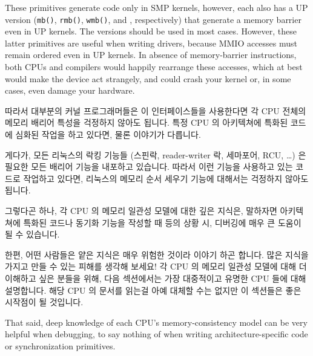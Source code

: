 These primitives generate code only in SMP kernels, however, each
also has a UP version ({\tt mb()}, {\tt rmb()}, {\tt wmb()},
and ,
respectively) that generate a memory barrier even in UP kernels. The 
versions should be used in most cases. However, these latter primitives
are useful when writing drivers, because MMIO accesses must remain
ordered even in UP kernels. In absence of memory-barrier instructions,
both CPUs and compilers would happily rearrange these accesses, which at
best would make the device act strangely, and could crash your kernel or,
in some cases, even damage your hardware.
\fi

따라서 대부분의 커널 프로그래머들은 이 인터페이스들을 사용한다면 각 CPU 전체의
메모리 배리어 특성을 걱정하지 않아도 됩니다.
특정 CPU 의 아키텍쳐에 특화된 코드에 심화된 작업을 하고 있다면, 물론 이야기가
다릅니다.

게다가, 모든 리눅스의 락킹 기능들 (스핀락, reader-writer 락, 세마포어, RCU,
\ldots) 은 필요한 모든 배리어 기능을 내포하고 있습니다.
따라서 이런 기능을 사용하고 있는 코드로 작업하고 있다면, 리눅스의 메모리 순서
세우기 기능에 대해서는 걱정하지 않아도 됩니다.

그렇다곤 하나, 각 CPU 의 메모리 일관성 모델에 대한 깊은 지식은, 말하자면
아키텍쳐에 특화된 코드나 동기화 기능을 작성할 때 등의 상황 시, 디버깅에 매우 큰
도움이 될 수 있습니다.

한편, 어떤 사람들은 얕은 지식은 매우 위험한 것이라 이야기 하곤 합니다.
많은 지식을 가지고 만들 수 있는 피해를 생각해 보세요!
각 CPU 의 메모리 일관성 모델에 대해 더 이해하고 싶은 분들을 위해, 다음
섹션에서는 가장 대중적이고 유명한 CPU 들에 대해 설명합니다.
해당 CPU 의 문서를 읽는걸 아예 대체할 수는 없지만 이 섹션들은 좋은 시작점이 될
것입니다.
\iffalse

That said, deep knowledge of each CPU's memory-consistency model
can be very helpful when debugging, to say nothing of when writing
architecture-specific code or synchronization primitives.

